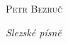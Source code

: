 \documentclass[11pt]{article}
\begin{document}
\setlength{\parindent}{2em}


\textsc{Petr Bezruč} \lipsum[1] \par \textit{Slezské písně} \lipsum[2]
\end{document}
